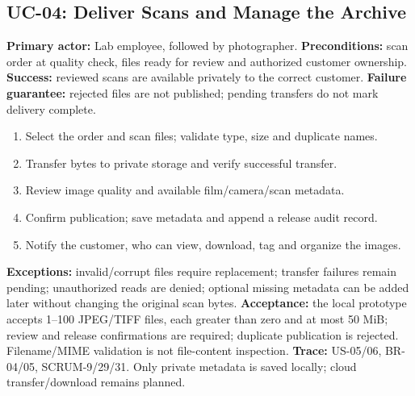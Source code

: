 \subsection{UC-04: Deliver Scans and Manage the Archive}
\textbf{Primary actor:} Lab employee, followed by photographer.
\textbf{Preconditions:} scan order at quality check, files ready for review and
authorized customer ownership. \textbf{Success:} reviewed scans are available
privately to the correct customer. \textbf{Failure guarantee:} rejected files
are not published; pending transfers do not mark delivery complete.
\begin{enumerate}
\item Select the order and scan files; validate type, size and duplicate names.
\item Transfer bytes to private storage and verify successful transfer.
\item Review image quality and available film/camera/scan metadata.
\item Confirm publication; save metadata and append a release audit record.
\item Notify the customer, who can view, download, tag and organize the images.
\end{enumerate}
\textbf{Exceptions:} invalid/corrupt files require replacement; transfer failures
remain pending; unauthorized reads are denied; optional missing metadata can be
added later without changing the original scan bytes.
\textbf{Acceptance:} the local prototype accepts 1--100 JPEG/TIFF files,
each greater than zero and at most 50 MiB; review and release confirmations are
required; duplicate publication is rejected. Filename/MIME validation is not
file-content inspection. \textbf{Trace:} US-05/06, BR-04/05, SCRUM-9/29/31.
Only private metadata is saved locally; cloud transfer/download remains planned.

\clearpage
